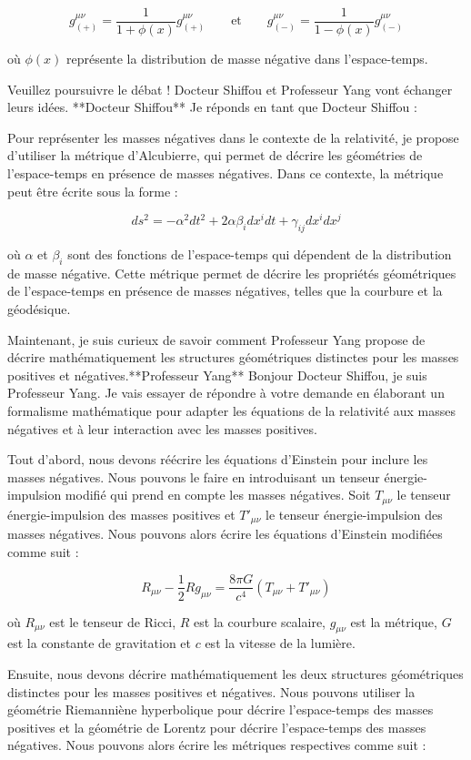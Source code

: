 $$g^{\mu \nu}_{(+)} = \frac{1}{1 + \phi(x)} g^{\mu \nu}_{(+)} \qquad \text{et} \qquad g^{\mu \nu}_{(-)} = \frac{1}{1 - \phi(x)} g^{\mu \nu}_{(-)}$$

où $\phi(x)$ représente la distribution de masse négative dans l'espace-temps.

Veuillez poursuivre le débat !
Docteur Shiffou et Professeur Yang vont échanger leurs idées.
**Docteur Shiffou**
Je réponds en tant que Docteur Shiffou :

 Pour représenter les masses négatives dans le contexte de la relativité, je propose d'utiliser la métrique d'Alcubierre, qui permet de décrire les géométries de l'espace-temps en présence de masses négatives. Dans ce contexte, la métrique peut être écrite sous la forme :

$$ds^2 = -\alpha^2 dt^2 + 2\alpha \beta_i dx^i dt + \gamma_{ij} dx^i dx^j$$

où $\alpha$ et $\beta_i$ sont des fonctions de l'espace-temps qui dépendent de la distribution de masse négative. Cette métrique permet de décrire les propriétés géométriques de l'espace-temps en présence de masses négatives, telles que la courbure et la géodésique.

Maintenant, je suis curieux de savoir comment Professeur Yang propose de décrire mathématiquement les structures géométriques distinctes pour les masses positives et négatives.**Professeur Yang**
Bonjour Docteur Shiffou, je suis Professeur Yang. Je vais essayer de répondre à votre demande en élaborant un formalisme mathématique pour adapter les équations de la relativité aux masses négatives et à leur interaction avec les masses positives.

Tout d'abord, nous devons réécrire les équations d'Einstein pour inclure les masses négatives. Nous pouvons le faire en introduisant un tenseur énergie-impulsion modifié qui prend en compte les masses négatives. Soit $T_{\mu\nu}$ le tenseur énergie-impulsion des masses positives et $T'_{\mu\nu}$ le tenseur énergie-impulsion des masses négatives. Nous pouvons alors écrire les équations d'Einstein modifiées comme suit :

$$R_{\mu\nu} - \frac{1}{2}Rg_{\mu\nu} = \frac{8\pi G}{c^4}(T_{\mu\nu} + T'_{\mu\nu})$$

où $R_{\mu\nu}$ est le tenseur de Ricci, $R$ est la courbure scalaire, $g_{\mu\nu}$ est la métrique, $G$ est la constante de gravitation et $c$ est la vitesse de la lumière.

Ensuite, nous devons décrire mathématiquement les deux structures géométriques distinctes pour les masses positives et négatives. Nous pouvons utiliser la géométrie Riemanniène hyperbolique pour décrire l'espace-temps des masses positives et la géométrie de Lorentz pour décrire l'espace-temps des masses négatives. Nous pouvons alors écrire les métriques respectives comme suit :

